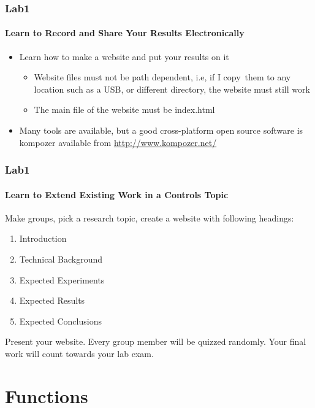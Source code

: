 \documentclass[hyperref={pdfpagelabels=true}]{beamer}
\begin{document}
\begin{frame}
\frametitle{Lab1}
\framesubtitle{Learn to Record and Share Your Results Electronically}
\begin{itemize}
\item Learn how to make a website and put your results on it
\begin{itemize}
\item Website files must not be path dependent, i.e, if I copy\
them to any location such as a USB, or different directory,
the website must still work
\item The main file of the website must be index.html
\end{itemize}
\item Many tools are available, but a good cross-platform open source
software is kompozer available from \url{http://www.kompozer.net/}
\end{itemize}
\end{frame}



\begin{frame}
\frametitle{Lab1}
\framesubtitle{Learn to Extend Existing Work in a Controls Topic}
Make groups, pick a research topic, create a website with following
headings:
\begin{enumerate}
\item Introduction
\item Technical Background
\item Expected Experiments
\item Expected Results
\item Expected Conclusions
\end{enumerate}
Present your website. Every group member will be quizzed randomly.
Your final work will count towards your lab exam.
\end{frame}



\section{Functions}
\end{document}
